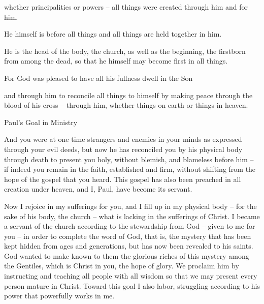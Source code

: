 {whether
principalities
or
powers
– all things
were created
through
him
and
for
him.
\par }{\Q {}He
himself
is
before
all things
and
all things
are held together
in
him.
\par }{\Q {}He
is
the head
of the body,
the church,
as well as the beginning,
the firstborn
from
among the dead,
so that
he
himself
may become
first
in
all things.
\par }{\Q {}For
God was pleased
to have all
his fullness
dwell
in
the Son
\par }{\Q {}and
through
him
to reconcile
all things
to
himself
by making peace
through
the blood
of his
cross
– through
him,
whether
things on
earth
or
things in
heaven.
\par }{\SH Paul’s Goal in Ministry
\par }{\PP {}And
you
were
at one time strangers
and
enemies
in
your minds
as expressed
through your evil
deeds,
but now he has reconciled you by
his
physical
body
through
death
to present
you
holy,
without
blemish,
and
blameless
before
him –
if
indeed
you remain
in the faith,
established
and
firm,
without
shifting
from
the hope
of the gospel
that
you heard.
This gospel has
also been preached
in
all
creation
under
heaven,
and I,
Paul,
have become
its servant.
\par }{\PP {}Now
I rejoice
in
my sufferings
for
you,
and
I fill up
in
my
physical body
– for the sake
of his
body,
the church
– what
is
lacking
in the sufferings
of Christ.
I
became
a servant
of the church according to
the stewardship
from God
– given
to me
for
you
– in order to complete
the word
of God,
that is, the mystery
that has been kept hidden
from
ages
and
generations,
but
has
now
been revealed
to his
saints.
God
wanted
to make known
to them the glorious
riches
of this
mystery
among
the Gentiles,
which is
Christ
in
you,
the hope
of glory.
We
proclaim
him by instructing
and
teaching
all
people
with
all
wisdom
so that
we may present
every
person
mature
in
Christ.
Toward
this goal
I
also
labor,
struggling
according
to his power
that powerfully
works
in
me.

}
